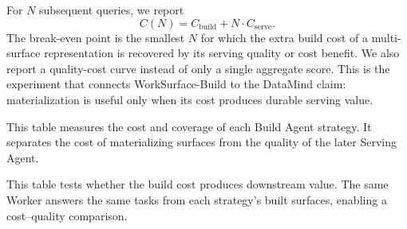 For $N$ subsequent queries, we report
\[
 C(N)=C_{\mathrm{build}}+N\cdot C_{\mathrm{serve}}.
\]
The break-even point is the smallest $N$ for which the extra build cost of a
multi-surface representation is recovered by its serving quality or cost
benefit. We also report a quality-cost curve instead of only a single
aggregate score. This is the experiment that connects WorkSurface-Build to the
DataMind claim: materialization is useful only when its cost produces durable
serving value.

This table measures the cost and coverage of each Build Agent strategy. It separates the cost of materializing surfaces from the quality of the later Serving Agent.

\begin{table}[t]
\centering\footnotesize
\setlength{\tabcolsep}{3.5pt}
\caption{RQ2 build cost and materialization coverage.}
\label{tab:rq2-build}
\scriptsize
\setlength{\tabcolsep}{4pt}
\end{table}

This table tests whether the build cost produces downstream value. The same Worker answers the same tasks from each strategy's built surfaces, enabling a cost--quality comparison.

\begin{table}[t]
\centering\footnotesize
\caption{RQ2 downstream serving value after materialization.}
\label{tab:rq2-serving}
\end{table}

